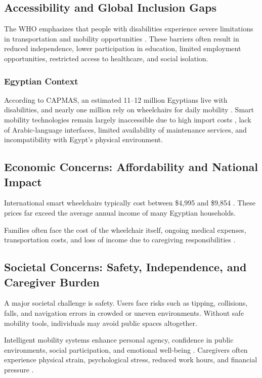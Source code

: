 \documentclass[12pt,a4paper]{report}
\begin{document}
\subsection{Accessibility and Global Inclusion Gaps}

The WHO emphasizes that people with disabilities experience severe limitations in transportation and mobility opportunities \cite{who_disability}.
These barriers often result in reduced independence, lower participation in education, limited employment opportunities, restricted access to healthcare, and social isolation.

\subsubsection{Egyptian Context}

According to CAPMAS, an estimated 11--12 million Egyptians live with disabilities, and nearly one million rely on wheelchairs for daily mobility \cite{idsc_egypt}. Smart mobility technologies remain largely inaccessible due to high import costs \cite{grandview_market}, lack of Arabic-language interfaces, limited availability of maintenance services, and incompatibility with Egypt's physical environment.

\subsection{Economic Concerns: Affordability and National Impact}

International smart wheelchairs typically cost between \$4,995 and \$9,854 \cite{grandview_market}. These prices far exceed the average annual income of many Egyptian households.

Families often face the cost of the wheelchair itself, ongoing medical expenses, transportation costs, and loss of income due to caregiving responsibilities \cite{egypt_social_solidarity}.

\subsection{Societal Concerns: Safety, Independence, and Caregiver Burden}

A major societal challenge is safety. Users face risks such as tipping, collisions, falls, and navigation errors in crowded or uneven environments. Without safe mobility tools, individuals may avoid public spaces altogether.

Intelligent mobility systems enhance personal agency, confidence in public environments, social participation, and emotional well-being \cite{who_disability}. 
Caregivers often experience physical strain, psychological stress, reduced work hours, and financial pressure \cite{egypt_social_solidarity}.
\end{document}
